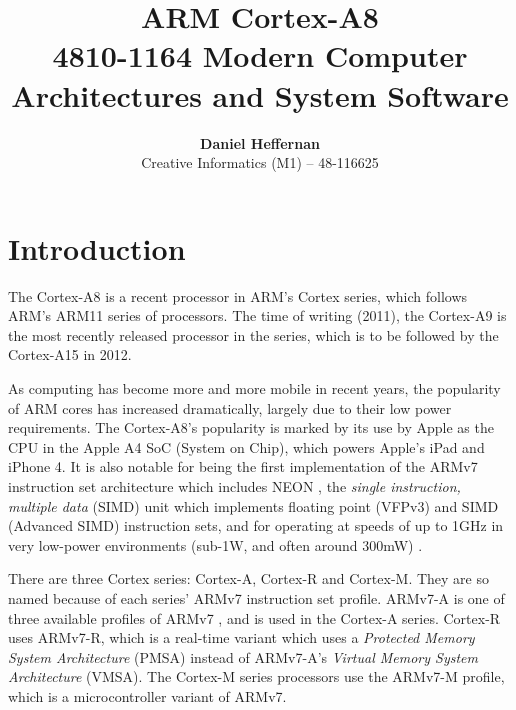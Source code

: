 \documentclass[oneside,a4paper]{report}
\title{ \textbf{ARM Cortex-A8} \\ \large{4810-1164 Modern Computer Architectures and System Software}}
\author{ \textbf{Daniel Heffernan} \\ Creative Informatics (M1) -- 48-116625 }
\begin{document}
\maketitle

\clearpage{}
\tableofcontents


\clearpage{}
\chapter{Introduction}

The Cortex-A8 is a recent processor in ARM's Cortex series, which follows ARM's ARM11 series of processors. The time of writing (2011), the Cortex-A9 is the most recently released processor in the series, which is to be followed by the Cortex-A15 in 2012.

As computing has become more and more mobile in recent years, the popularity of ARM cores has increased dramatically, largely due to their low power requirements. The Cortex-A8's popularity is marked by its use by Apple as the CPU in the Apple A4 SoC (System on Chip), which powers Apple's iPad and iPhone 4. It is also notable for being the first implementation of the ARMv7 instruction set architecture which includes NEON \cite{Gris}, the \emph{single instruction, multiple data} (SIMD) unit which implements floating point (VFPv3) and SIMD (Advanced SIMD) instruction sets, and for operating at speeds of up to 1GHz in very low-power environments (sub-1W, and often around 300mW) \cite{Williamson}.

There are three Cortex series: Cortex-A, Cortex-R and Cortex-M. They are so named because of each series' ARMv7 instruction set profile. ARMv7-A is one of three available profiles of ARMv7 \cite[p. A1-4]{ARMRef}, and is used in the Cortex-A series. Cortex-R uses ARMv7-R, which is a real-time variant which uses a \emph{Protected Memory System Architecture} (PMSA) instead of ARMv7-A's \emph{Virtual Memory System Architecture} (VMSA). The Cortex-M series processors use the ARMv7-M profile, which is a microcontroller variant of ARMv7.
\end{document}
